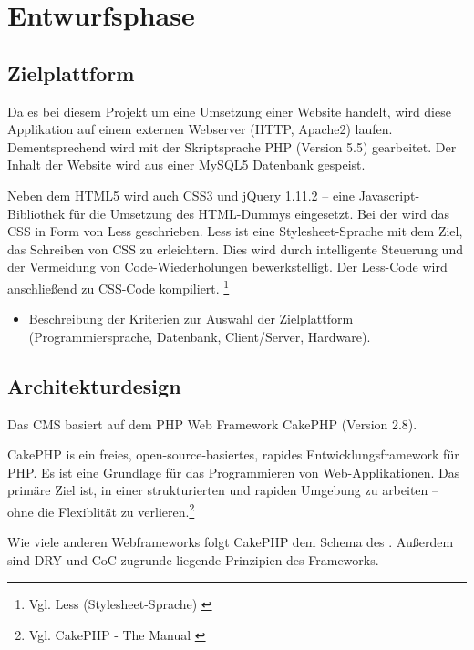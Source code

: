 \section{Entwurfsphase} 
\label{sec:Entwurfsphase}

\subsection{Zielplattform}
\label{sec:Zielplattform}
Da es bei diesem Projekt um eine Umsetzung einer Website handelt, wird diese
Applikation auf einem externen Webserver (\ac{HTTP}, Apache2) laufen.
Dementsprechend wird mit der Skriptsprache \ac{PHP} (Version 5.5) gearbeitet. Der Inhalt der Website wird aus
einer MySQL5 Datenbank gespeist.

Neben dem HTML5 wird auch
\ac{CSS}3 und jQuery 1.11.2 -- eine Javascript-Bibliothek für die Umsetzung des
HTML-Dummys eingesetzt. Bei der \mh wird das \ac{CSS} in Form von Less
geschrieben. Less ist eine Stylesheet-Sprache mit dem Ziel, das Schreiben von
CSS zu erleichtern. Dies wird durch intelligente Steuerung und der Vermeidung von 
Code-Wiederholungen bewerkstelligt. Der Less-Code wird anschließend
zu CSS-Code kompiliert.  \footnote{Vgl. Less (Stylesheet-Sprache)
\cite{wiki:Less_(Stylesheet-Sprache)}}

\begin{itemize}
	\item Beschreibung der Kriterien zur Auswahl der Zielplattform (\ua Programmiersprache, Datenbank, Client/Server, Hardware).
\end{itemize}


\subsection{Architekturdesign}
\label{sec:Architekturdesign}
Das \ac{CMS} \ct basiert auf dem \ac{PHP} Web Framework CakePHP (Version 2.8).

CakePHP is ein freies, open-source-basiertes, rapides Entwicklungsframework für PHP.
Es ist eine Grundlage für das Programmieren von Web-Applikationen.
Das primäre Ziel ist, in einer strukturierten und rapiden Umgebung zu arbeiten
 -- ohne die Flexiblität zu verlieren.\footnote{Vgl. CakePHP - The Manual
 \cite{CakePHP}}

Wie viele anderen Webframeworks folgt CakePHP dem Schema des
. Außerdem sind \ac{DRY}
und \ac{CoC} zugrunde liegende Prinzipien des Frameworks.

